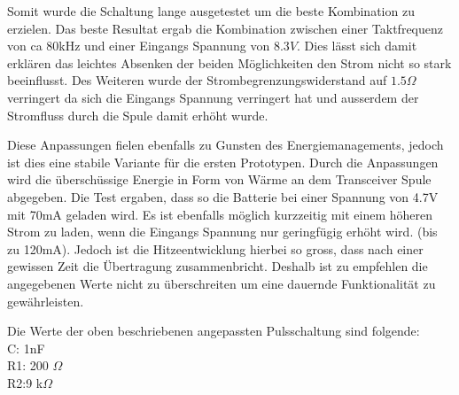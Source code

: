 Somit wurde die Schaltung lange ausgetestet um die beste Kombination zu erzielen. Das beste Resultat ergab die Kombination zwischen einer Taktfrequenz von ca 80kHz und einer Eingangs Spannung von $8.3V$. Dies lässt sich damit erklären das leichtes Absenken der beiden Möglichkeiten den Strom nicht so stark beeinflusst. Des Weiteren wurde der Strombegrenzungswiderstand auf $1.5\Omega$ verringert da sich die Eingangs Spannung verringert hat und ausserdem der Stromfluss durch die Spule damit erhöht wurde. 

Diese Anpassungen fielen ebenfalls zu Gunsten des Energiemanagements, jedoch ist dies eine stabile Variante für die ersten Prototypen. Durch die Anpassungen wird die überschüssige Energie in Form von Wärme an dem Transceiver Spule abgegeben. Die Test ergaben, dass so die Batterie bei einer Spannung von 4.7V mit 70mA geladen wird. Es ist ebenfalls möglich kurzzeitig mit einem höheren Strom zu laden, wenn die Eingangs Spannung nur geringfügig erhöht wird. (bis zu 120mA). Jedoch ist die Hitzeentwicklung hierbei so gross, dass nach einer gewissen Zeit die Übertragung zusammenbricht. Deshalb ist zu empfehlen die angegebenen Werte nicht zu überschreiten um eine dauernde Funktionalität zu gewährleisten.

Die Werte der oben beschriebenen angepassten Pulsschaltung sind folgende:\\
C: 1nF\\
R1: 200 $\Omega$\\
R2:9 k$\Omega$\\
